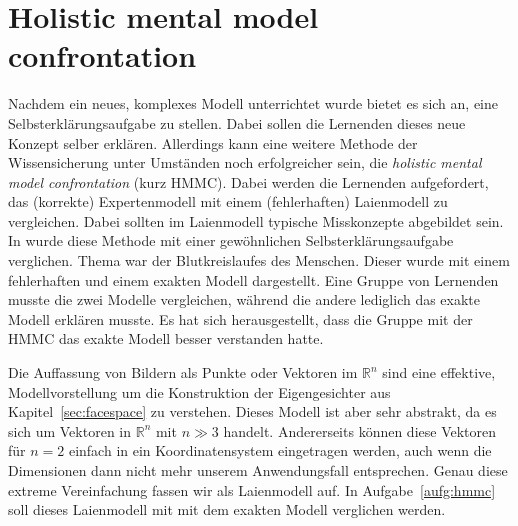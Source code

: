 \section{Holistic mental model confrontation}
Nachdem ein neues, komplexes Modell unterrichtet wurde bietet es sich an, eine Selbsterklärungsaufgabe zu stellen.
Dabei sollen die Lernenden dieses neue Konzept selber erklären.
Allerdings kann eine weitere Methode der Wissensicherung unter Umständen noch erfolgreicher sein, die \textit{holistic mental model confrontation} (kurz HMMC).
Dabei werden die Lernenden aufgefordert, das (korrekte) Expertenmodell mit einem (fehlerhaften) Laienmodell zu vergleichen.
Dabei sollten im Laienmodell typische Misskonzepte abgebildet sein.
In \cite{Gadgil2012} wurde diese Methode mit einer gewöhnlichen Selbsterklärungsaufgabe verglichen.
Thema war der Blutkreislaufes des Menschen.
Dieser wurde mit einem fehlerhaften und einem exakten Modell dargestellt.
Eine Gruppe von Lernenden musste die zwei Modelle vergleichen, während die andere lediglich das exakte Modell erklären musste.
Es hat sich herausgestellt, dass die Gruppe mit der HMMC das exakte Modell besser verstanden hatte.

Die Auffassung von Bildern als Punkte oder Vektoren im $\mathbb R^n$ sind eine effektive, Modellvorstellung um die Konstruktion der Eigengesichter aus Kapitel~\ref{sec:facespace} zu verstehen.
Dieses Modell ist aber sehr abstrakt, da es sich um Vektoren in $\mathbb R^n$ mit $n\gg 3$ handelt.
Andererseits können diese Vektoren für $n=2$ einfach in ein Koordinatensystem eingetragen werden, auch wenn die Dimensionen dann nicht mehr unserem Anwendungsfall entsprechen.
Genau diese extreme Vereinfachung fassen wir als Laienmodell auf.
In Aufgabe~\ref{aufg:hmmc} soll dieses Laienmodell mit mit dem exakten Modell verglichen werden.
